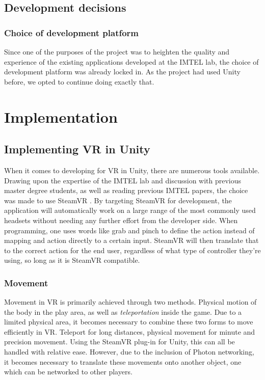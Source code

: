 \subsection{Development decisions}
\subsubsection{Choice of development platform}
Since one of the purposes of the project was to heighten the quality and experience of the existing applications developed at the IMTEL lab, the choice of development platform was already locked in. As the project had used Unity before, we opted to continue doing exactly that.





\section{Implementation}

\subsection{Implementing VR in Unity}
When it comes to developing for VR in Unity, there are numerous tools available. Drawing upon the expertise of the IMTEL lab and discussion with previous master degree students, as well as reading previous IMTEL papers, the choice was made to use SteamVR \cite{steamVR}\cite{steamVRAPI}. By targeting SteamVR for development, the application will automatically work on a large range of the most commonly used headsets without needing any further effort from the developer side. When programming, one uses words like grab and pinch to define the action instead of mapping and action directly to a certain input. SteamVR will then translate that to the correct action for the end user, regardless of what type of controller they're using, so long as it is SteamVR compatible.

\subsubsection{Movement}
Movement in VR is primarily achieved through two methods. Physical motion of the body in the play area, as well as \textit{teleportation} inside the game. Due to a limited physical area, it becomes necessary to combine these two forms to move efficiently in VR. Teleport for long distances, physical movement for minute and precision movement. Using the SteamVR plug-in for Unity\cite{steamVRAPI}, this can all be handled with relative ease. However, due to the inclusion of Photon networking, it becomes necessary to translate these movements onto another object, one which can be networked to other players. 

